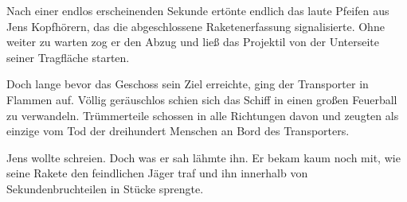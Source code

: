\par

Nach einer endlos erscheinenden Sekunde ertönte endlich das laute Pfeifen aus Jens Kopfhörern, das die abgeschlossene Raketenerfassung signalisierte. Ohne weiter zu warten zog er den Abzug und ließ das Projektil von der Unterseite seiner Tragfläche starten.

\par

Doch lange bevor das Geschoss sein Ziel erreichte, ging der Transporter in Flammen auf. Völlig geräuschlos schien sich das Schiff in einen großen Feuerball zu verwandeln. Trümmerteile schossen in alle Richtungen davon und zeugten als einzige vom Tod der dreihundert Menschen an Bord des Transporters.

\par

Jens wollte schreien. Doch was er sah lähmte ihn. Er bekam kaum noch mit, wie seine Rakete den feindlichen Jäger traf und ihn innerhalb von Sekundenbruchteilen in Stücke sprengte.
